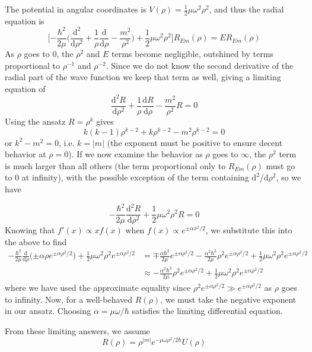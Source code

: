 \documentclass[../principles-of-quantum-mechanics.tex]{subfiles}
\begin{document}
\begin{questions}
\begin{solution}
		The potential in angular coordinates is $V(\rho) = \tfrac{1}{2}\mu\omega^2\rho^2$, and thus the radial equation is
		$$\Big[{-\frac{\hbar^2}{2\mu}}\Big(\frac{\mathrm{d}^2}{\mathrm{d}\rho^2} + \frac{1}{\rho}\frac{\mathrm{d}}{\mathrm{d}\rho} - \frac{m^2}{\rho^2}\Big) + \frac{1}{2}\mu\omega^2\rho^2\Big]R_{\textit{Em}}(\rho) = ER_{\textit{Em}}(\rho)$$
		As $\rho$ goes to $0$, the $\rho^2$ and $E$ terms become negligible, outshined by terms proportional to $\rho^{-1}$ and $\rho^{-2}$. Since we do not know the second derivative of the radial part of the wave function we keep that term as well, giving a limiting equation of
		$$\frac{\mathrm{d}^2R}{\mathrm{d}\rho^2} + \frac{1}{\rho}\frac{\mathrm{d}R}{\mathrm{d}\rho} - \frac{m^2}{\rho^2}R = 0$$
		Using the ansatz $R = \rho^{k}$ gives
		$$k(k - 1)\rho^{k - 2} + k\rho^{k - 2} - m^2\rho^{k - 2} = 0$$
		or $k^2 - m^2 = 0$, i.e. $k = |m|$ (the exponent must be positive to ensure decent behavior at $\rho = 0$).
		If we now examine the behavior as $\rho$ goes to $\infty$, the $\rho^2$ term is much larger than all others (the term proportional only to $R_{Em}(\rho)$ must go to $0$ at infinity), with the possible exception of the term containing $\mathrm{d}^2/\mathrm{d}\rho^2$, so we have
		
		$$-\frac{\hbar^2}{2\mu}\frac{\mathrm{d}^2R}{\mathrm{d}\rho^2} + \frac{1}{2}\mu\omega^2\rho^2 R = 0$$
		Knowing that $f'(x) \propto xf(x)$ when $f(x) \propto e^{\pm \alpha x^2/2}$, we substitute this into the above to find
		\begin{align*}
			-\frac{\hbar^2}{2\mu}\frac{\mathrm{d}}{\mathrm{d}\rho}\Big({\pm\alpha\rho e^{\pm\alpha\rho^2/2}}\Big) + \frac{1}{2}\mu\omega^2\rho^2e^{\pm\alpha \rho^2/2} &= \mp\frac{\alpha\hbar^2}{2\mu}e^{\pm\alpha\rho^2/2} - \frac{\alpha^2\hbar^2}{2\mu}\rho^2e^{\pm\alpha\rho^2/2} + \frac{1}{2}\mu\omega^2\rho^2e^{\pm\alpha\rho^2/2} \\
			&\approx -\frac{\alpha^2\hbar^2}{2\mu}\rho^2e^{\pm\alpha\rho^2/2} + \frac{1}{2}\mu\omega^2\rho^2e^{\pm\alpha\rho^2/2}
		\end{align*}
		where we have used the approximate equality since $\rho^2 e^{\pm\alpha\rho^2/2} \gg e^{\pm\alpha\rho^2/2}$ as $\rho$ goes to infinity. Now, for a well-behaved $R(\rho)$, we must take the negative exponent in our ansatz. Choosing $\alpha = \mu\omega/\hbar$ satisfies the limiting differential equation.
		
		From these limiting answers, we assume
		$$R(\rho) = \rho^{|m|}e^{-\mu\omega\rho^2/2\hbar}U(\rho)$$
		

\end{solution}
\end{questions}
\end{document}
